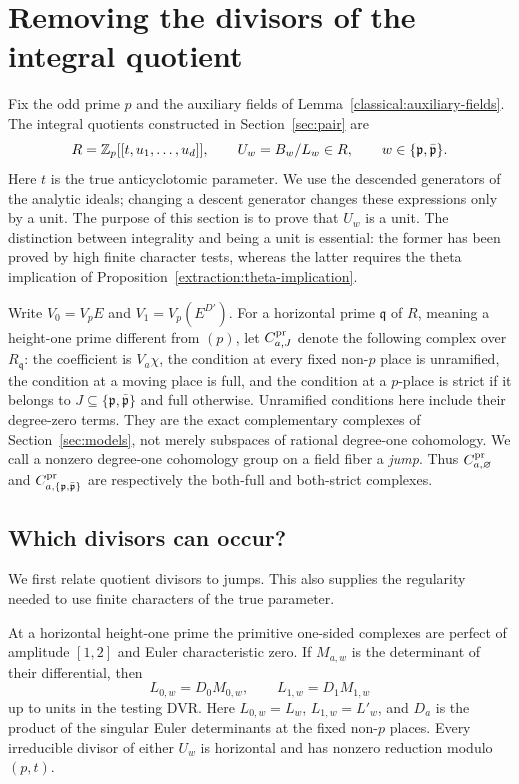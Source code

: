 \section{Removing the divisors of the integral quotient}\label{sec:unit}

Fix the odd prime $p$ and the auxiliary fields of
Lemma~\ref{classical:auxiliary-fields}.  The integral quotients constructed
in Section~\ref{sec:pair} are
\[
 R=\mathbb Z_p[[t,u_1,\ldots,u_d]],\qquad U_w=B_w/L_w\in R,
 \qquad w\in\{\mathfrak p,\bar{\mathfrak p}\}.
\]
Here $t$ is the true anticyclotomic parameter.  We use the descended
generators of the analytic ideals; changing a descent generator changes
these expressions only by a unit.  The purpose of this section is to
prove that $U_w$ is a unit.  The distinction between integrality and
being a unit is essential: the former has been proved by high finite
character tests, whereas the latter requires the theta implication of
Proposition~\ref{extraction:theta-implication}.

Write $V_0=V_pE$ and $V_1=V_p(E^{D'})$.  For a horizontal prime
$\mathfrak q$ of $R$, meaning a height-one prime different from $(p)$,
let $C^{\rm pr}_{a,J}$ denote the following complex over $R_{\mathfrak q}$:
the coefficient is $V_a\chi$, the condition at every fixed non-$p$
place is unramified, the condition at a moving place is full, and the
condition at a $p$-place is strict if it belongs to
$J\subseteq\{\mathfrak p,\bar{\mathfrak p}\}$ and full otherwise.
Unramified conditions here include their degree-zero terms.  They are
the exact complementary complexes of Section~\ref{sec:models}, not
merely subspaces of rational degree-one cohomology.  We call a nonzero
degree-one cohomology group on a field fiber a \emph{jump}.  Thus
$C^{\rm pr}_{a,\varnothing}$ and
$C^{\rm pr}_{a,\{\mathfrak p,\bar{\mathfrak p}\}}$ are respectively the
both-full and both-strict complexes.

\subsection{Which divisors can occur?}

We first relate quotient divisors to jumps.  This also supplies the
regularity needed to use finite characters of the true parameter.

\begin{lemma}\label{unit:quotient-regularity}
At a horizontal height-one prime the primitive one-sided complexes are
perfect of amplitude $[1,2]$ and Euler characteristic zero.  If
$M_{a,w}$ is the determinant of their differential, then
\[
 L_{0,w}=D_0M_{0,w},\qquad L_{1,w}=D_1M_{1,w}
\]
up to units in the testing DVR.  Here $L_{0,w}=L_w$, $L_{1,w}=L'_w$,
and $D_a$ is the product of the singular Euler determinants at the
fixed non-$p$ places.  Every irreducible divisor of either $U_w$ is
horizontal and has nonzero reduction modulo $(p,t)$.
\end{lemma}

